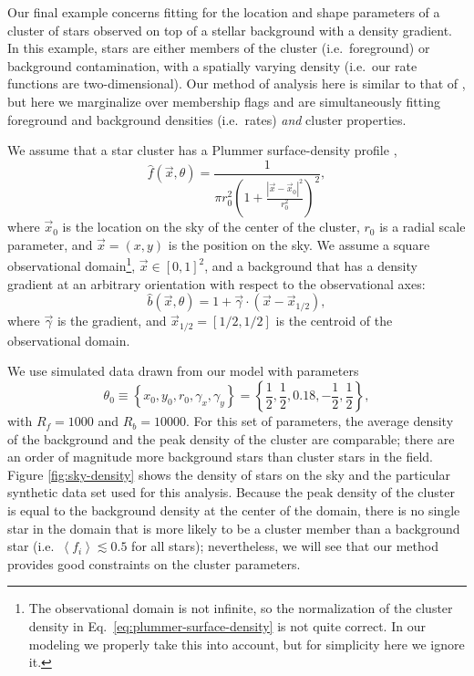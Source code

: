 \documentclass[aps,prd,reprint,nofootinbib]{revtex4-1}
\begin{document}
Our final example concerns fitting for the location and shape
parameters of a cluster of stars observed on top of a stellar
background with a density gradient.  In this example, stars are either
members of the cluster (i.e.~foreground) or background contamination,
with a spatially varying density (i.e.~our rate functions are
two-dimensional).  Our method of analysis here is similar to that of
\citet{DeGennaro2009}, but here we marginalize over membership flags
and are simultaneously fitting foreground and background densities
(i.e.\ rates) \emph{and} cluster properties.  

We assume that a star cluster has a Plummer surface-density profile
\citep{Plummer1911,Aarseth1974},
\begin{equation}
  \label{eq:plummer-surface-density}
  \hat{f}(\vec{x}, \theta) = \frac{1}{\pi r_0^2 \left( 1 +
    \frac{\left| \vec{x} - \vec{x}_0 \right|^2}{r_0^2} \right)^2},
\end{equation}
where $\vec{x}_0$ is the location on the sky of the center of the
cluster, $r_0$ is a radial scale parameter, and $\vec{x} = \left( x, y
\right)$ is the position on the sky.  We assume a square observational
domain\footnote{The observational domain is not infinite, so the
  normalization of the cluster density in
  Eq.~\eqref{eq:plummer-surface-density} is not quite correct.  In our
  modeling we properly take this into account, but for simplicity here
  we ignore it.}, $\vec{x} \in [0,1]^2$, and a background that has a
density gradient at an arbitrary orientation with respect to the
observational axes:
\begin{equation}
  \hat{b}\left(\vec{x}, \theta\right) = 1 + \vec{\gamma} \cdot \left(
  \vec{x} - \vec{x}_{1/2} \right),
\end{equation}
where $\vec{\gamma}$ is the gradient, and $\vec{x}_{1/2} = [1/2, 1/2]$
is the centroid of the observational domain.  

We use simulated data drawn from our model with parameters
\begin{equation}
\label{eq:true-cluster-parameters}
\theta_0 \equiv \left\{ x_0, y_0, r_0, \gamma_x, \gamma_y \right\} =
\left\{ \frac{1}{2}, \frac{1}{2}, 0.18, -\frac{1}{2}, \frac{1}{2}
\right\},
\end{equation}
with $R_f = 1000$ and $R_b = 10000$.  For this set of parameters, the
average density of the background and the peak density of the cluster
are comparable; there are an order of magnitude more background stars
than cluster stars in the field.  Figure \ref{fig:sky-density} shows
the density of stars on the sky and the particular synthetic data set
used for this analysis.  Because the peak density of the cluster is
equal to the background density at the center of the domain, there is
no single star in the domain that is more likely to be a cluster
member than a background star (i.e.\ $\left \langle f_i \right \rangle
\lesssim 0.5$ for all stars); nevertheless, we will see that our
method provides good constraints on the cluster parameters.
\end{document}
